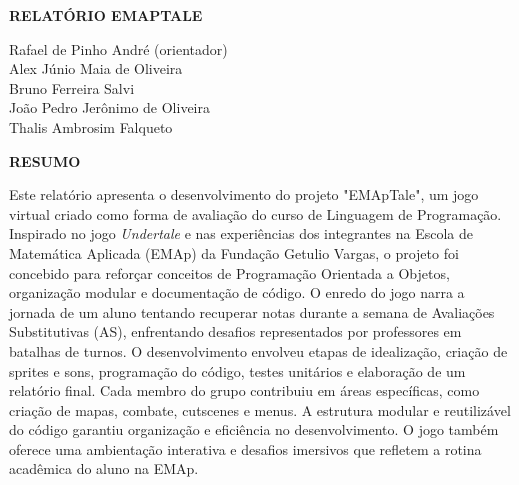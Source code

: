 \documentclass[a4paper, 12pt, twoside]{article}
\newcommand{\titulo}{Relatório EMApTale}
\newcommand{\orientador}{Rafael de Pinho André (orientador)}
\newcommand{\autor}{Alex Júnio Maia de Oliveira}
\newcommand{\autordois}{Bruno Ferreira  Salvi}
\newcommand{\autortres}{João Pedro Jerônimo de Oliveira}
\newcommand{\autorcinco}{Thalis Ambrosim Falqueto}
\begin{document}

\singlespacing %
\justifying %


\vspace*{0.5cm} %
\begin{center} %
\textbf{\MakeUppercase{\titulo}}       
\end{center} %


\begin{flushright}
\orientador \\

\autor  \\
\autordois  \\
\autortres  \\
\autorcinco \\
 
\end{flushright}


\begin{center}
\vspace*{0.5cm}
\textbf{\MakeUppercase{Resumo}}
\end{center}

\noindent
Este relatório apresenta o desenvolvimento do projeto "EMApTale", um jogo virtual criado como forma de avaliação do curso de Linguagem de Programação. Inspirado no jogo \textit{Undertale} e nas experiências dos integrantes na Escola de Matemática Aplicada (EMAp) da Fundação Getulio Vargas, o projeto foi concebido para reforçar conceitos de Programação Orientada a Objetos, organização modular e documentação de código. O enredo do jogo narra a jornada de um aluno tentando recuperar notas durante a semana de Avaliações Substitutivas (AS), enfrentando desafios representados por professores em batalhas de turnos. O desenvolvimento envolveu etapas de idealização, criação de sprites e sons, programação do código, testes unitários e elaboração de um relatório final. Cada membro do grupo contribuiu em áreas específicas, como criação de mapas, combate, cutscenes e menus. A estrutura modular e reutilizável do código garantiu organização e eficiência no desenvolvimento. O jogo também oferece uma ambientação interativa e desafios imersivos que refletem a rotina acadêmica do aluno na EMAp.
\end{document}
